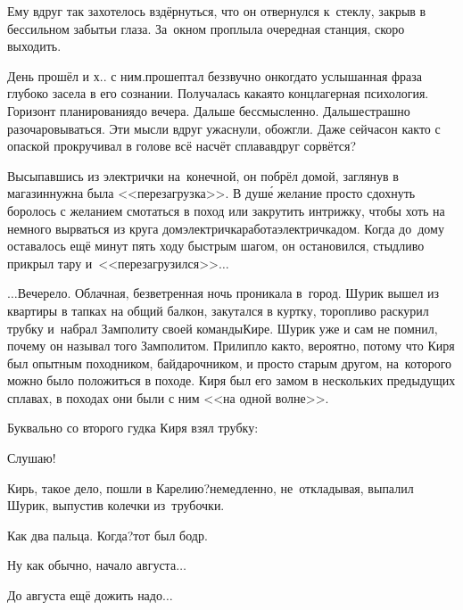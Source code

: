 {	Ему вдруг так захотелось вздёрнуться, что он отвернулся к~стеклу, закрыв в бессильном забытьи глаза. За~окном проплыла очередная станция, скоро выходить.
	
	\diagdash День прошёл и х.. с ним.\mdash прошептал беззвучно он\mdash когда\sdash то услышанная фраза глубоко засела в его сознании. Получалась какая\sdash то концлагерная психология. Горизонт планирования\mdash до вечера. Дальше бессмысленно. Дальше\mdash страшно разочаровываться. Эти мысли вдруг ужаснули, обожгли. Даже сейчас\mdash он как\sdash то с опаской прокручивал в голове всё насчёт сплава\mdash вдруг сорвётся? 
	
	Высыпавшись из электрички на~конечной, он побрёл домой, заглянув в магазин\mdash нужна была <<перезагрузка>>. В душ\'е желание просто сдохнуть боролось с желанием смотаться в поход или закрутить интрижку, чтобы хоть на немного вырваться из круга дом\nbdash электричка\nbdash работа\nbdash электричка\nbdash дом. Когда до~дому оставалось ещё минут пять ходу быстрым шагом, он остановился, стыдливо прикрыл тару и~<<перезагрузился>>$\ldots$
	
	
	$\ldots$Вечерело. Облачная, безветренная ночь проникала в~город.  Шурик вышел из квартиры в тапках на общий балкон, закутался в куртку, торопливо раскурил трубку и~набрал Замполиту своей команды\mdash Кире. Шурик уже и сам не помнил, почему он называл того Замполитом. Прилипло как\sdash то, вероятно, потому что Киря был опытным походником, байдарочником, и просто старым другом, на~которого можно было положиться в походе. Киря был его замом в нескольких предыдущих сплавах, в походах они были с ним <<на одной волне>>.

	Буквально со второго гудка Киря взял трубку:
	
	\diagdash Слушаю!
	
	\diagdash Кирь, такое дело, пошли в Карелию?\mdash немедленно, не~откладывая, выпалил Шурик, выпустив колечки из~трубочки.
	
	\diagdash Как два пальца. Когда?\mdash тот был бодр.
	
	\diagdash Ну как обычно, начало августа$\ldots$
	
	\diagdash До августа ещё дожить надо$\ldots$
	
}
